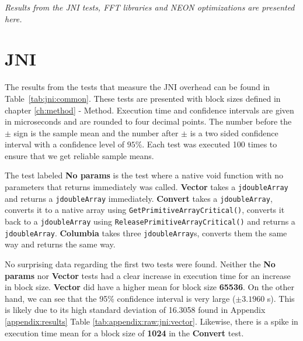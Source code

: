 \textit{Results from the JNI tests, FFT libraries and NEON optimizations are presented here.}

\section{JNI}
The results from the tests that measure the JNI overhead can be found in Table~\ref{tab:jni:common}. These tests are presented with block sizes defined in chapter \ref{ch:method} - Method. Execution time and confidence intervals are given in microseconds and are rounded to four decimal points. The number before the $\pm$ sign is the sample mean and the number after $\pm$ is a two sided confidence interval with a confidence level of $95\%$. Each test was executed 100 times to ensure that we get reliable sample means.

The test labeled \textbf{No params} is the test where a native void function with no parameters that returns immediately was called. \textbf{Vector} takes a \texttt{jdoubleArray} and returns a \texttt{jdoubleArray} immediately. \textbf{Convert} takes a \texttt{jdoubleArray}, converts it to a native array using \texttt{GetPrimitiveArrayCritical()}, converts it back to a \texttt{jdoubleArray} using \texttt{ReleasePrimitiveArrayCritical()} and returns a \texttt{jdoubleArray}. \textbf{Columbia} takes three \texttt{jdoubleArray}s, converts them the same way and returns the same way.

No surprising data regarding the first two tests were found. Neither the \textbf{No params} nor \textbf{Vector} tests had a clear increase in execution time for an increase in block size. \textbf{Vector} did have a higher mean for block size \textbf{65536}. On the other hand, we can see that the 95\% confidence interval is very large ($\pm 3.1960$ \textmu s). This is likely due to its high standard deviation of 16.3058 found in Appendix \ref{appendix:results} Table \ref{tab:appendix:raw:jni:vector}. Likewise, there is a spike in execution time mean for a block size of \textbf{1024} in the \textbf{Convert} test.



